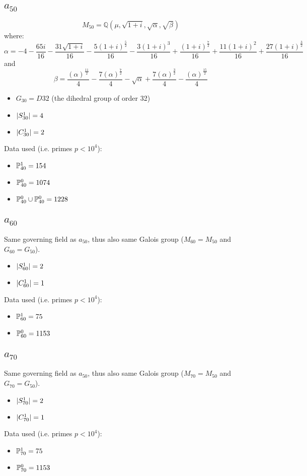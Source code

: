 \subsection{{\huge $a_{50}$}}
$$M_{50} = \mathbb{Q}\left(\mu, \sqrt{1+i}, \sqrt{\alpha}, \sqrt{\beta}\right)$$
where:
$$\alpha = -4 - \frac{65 i}{16} - \frac{31 \sqrt{1 + i}}{16} - \frac{5 \left(1 + i\right)^{\frac{5}{2}}}{16} - \frac{3 \left(1 + i\right)^{3}}{16} + \frac{\left(1 + i\right)^{\frac{7}{2}}}{16} + \frac{11 \left(1 + i\right)^{2}}{16} + \frac{27 \left(1 + i\right)^{\frac{3}{2}}}{16}$$
and 
$$\beta = \frac{\left(\alpha\right)^{\frac{11}{2}}}{4} - \frac{7 \left(\alpha\right)^{\frac{7}{2}}}{4} - \sqrt{\alpha} + \frac{7 \left(\alpha\right)^{\frac{3}{2}}}{4} - \frac{\left(\alpha\right)^{\frac{15}{2}}}{4}$$
\begin{itemize}
	\item $G_{30} = D32$ (the dihedral group of order 32)
	\item $| S_{30}^1 | = 4$
	\item $| C_{30}^1 | = 2$
\end{itemize}
Data used (i.e. primes $p<10^4$):
\begin{itemize}
	\item $\mathbb{P}_{40}^1 = 154$
	\item $\mathbb{P}_{40}^0 = 1074$
	\item $\mathbb{P}_{40}^0 \cup \mathbb{P}_{40}^0 = 1228$
\end{itemize}
\subsection{{\huge $a_{60}$}}
Same governing field as $a_{50}$, thus also same Galois group ($M_{60} = M_{50}$ and $G_{60} = G_{50}$).
\begin{itemize}
	\item $| S_{60}^1 | = 2$
	\item $| C_{60}^1 | = 1$
\end{itemize}
Data used (i.e. primes $p<10^4$):
\begin{itemize}
	\item $\mathbb{P}_{60}^1 = 75$
	\item $\mathbb{P}_{60}^0 = 1153$
\end{itemize}
\subsection{{\huge $a_{70}$}}
Same governing field as $a_{50}$, thus also same Galois group ($M_{70} = M_{50}$ and $G_{70} = G_{50}$).
\begin{itemize}
	\item $| S_{70}^1 | = 2$
	\item $| C_{70}^1 | = 1$
\end{itemize}
Data used (i.e. primes $p<10^4$):
\begin{itemize}
	\item $\mathbb{P}_{70}^1 = 75$
	\item $\mathbb{P}_{70}^0 = 1153$
\end{itemize}
